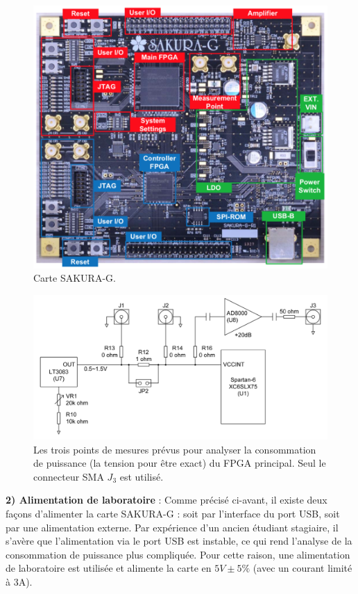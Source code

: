 \documentclass[oneside]{book}
\begin{document}
\newpage

\begin{figure}[htbp]
    \centering
    \includegraphics[scale=0.69]{image/Sakura}
    \caption{Carte SAKURA-G.}
    \label{fig:sakura} 
\end{figure}

\begin{figure}[htbp]
    \centering
    \includegraphics[scale=0.62]{image/points_mesures}
    \caption{Les trois points de mesures prévus pour analyser la consommation de puissance (la tension pour être exact) du FPGA principal. Seul le connecteur SMA $J_3$ est utilisé.}
    \label{fig:mesurePoints} 
\end{figure}

\hspace{-0.5cm}\textbf{2) Alimentation de laboratoire} : Comme précisé ci-avant, il existe deux façons d'alimenter la carte SAKURA-G : soit par l'interface du port USB, soit par une alimentation externe. Par expérience d'un ancien étudiant stagiaire, il s'avère que l'alimentation via le port USB est instable, ce qui rend l'analyse de la consommation de puissance plus compliquée. Pour cette raison, une alimentation de laboratoire est utilisée et alimente la carte en $5V\pm 5\%$ (avec un courant limité à 3A).  
\end{document}
